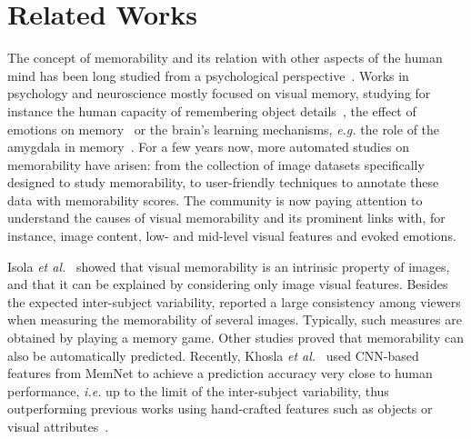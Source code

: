 \documentclass{sig-alternate-05-2015}
\begin{document}
\section{Related Works}
The concept of memorability and its relation with other aspects of the human mind has been long studied from a psychological perspective~\cite{maren1999long,anderson2006emotion,brady2008visual,hunt2006distinctiveness,phelps2004human,bradley1992remembering}. 
Works in psychology and neuroscience mostly focused on visual memory, studying for instance the human capacity of remembering object details~\cite{brady2008visual}, the effect of emotions on memory~\cite{anderson2006emotion,phelps2004human,bradley1992remembering} or the brain's learning mechanisms, \textit{e.g.} the role of the amygdala in memory~\cite{maren1999long,phelps2004human}.
For a few years now, more automated studies on memorability have arisen: from the collection of image datasets specifically designed to study memorability, to user-friendly techniques to annotate these data with memorability scores. The community is now paying attention to understand the causes of visual memorability and its prominent links with, for instance, image content, low- and mid-level visual features and evoked emotions.

Isola \textit{et al.}~\cite{isola2011what} showed that visual memorability is an intrinsic property of images, and that it can be explained by considering only image visual features. Besides the expected inter-subject variability, \cite{isola2011what} reported a large consistency among viewers when measuring the memorability of several images. Typically, such measures are obtained by playing a memory game. Other studies proved that memorability can also be automatically predicted. Recently, Khosla \textit{et al.}~\cite{khosla2015understanding} used CNN-based features from MemNet to achieve a prediction accuracy very close to human performance, \textit{i.e.} up to the limit of the inter-subject variability, thus outperforming previous works using hand-crafted features such as objects or visual attributes~\cite{isola2014what}. %
\end{document}
